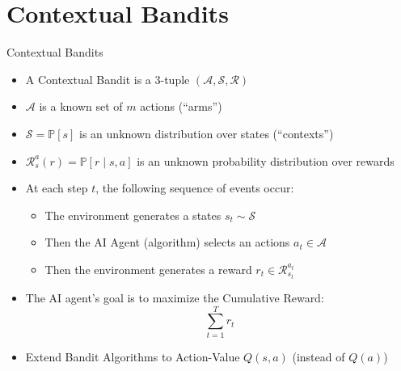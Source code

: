 \section{Contextual Bandits}
\begin{frame}[shrink=10]{Contextual Bandits}
\begin{itemize}
    \item A Contextual Bandit is a 3-tuple $(\mathcal{A}, \mathcal{S}, \mathcal{R})$
    \item $\mathcal{A}$ is a known set of $m$ actions (``arms'')
    \item $\mathcal{S} = \mathbb{P}[s]$ is an unknown distribution over states (``contexts'')
    \item $\mathcal{R}^{a}_{s}(r) = \mathbb{P}[r \mid s, a]$ is an unknown probability distribution over
          rewards
    \item At each step $t$, the following sequence of events occur:
    \begin{itemize}
        \item The environment generates a states $s_t \sim \mathcal{S}$
        \item Then the AI Agent (algorithm) selects an actions $a_t \in \mathcal{A}$
        \item Then the environment generates a reward $r_t \in \mathcal{R}^{a_t}_{s_t}$
    \end{itemize}
    \item The AI agent's goal is to maximize the Cumulative Reward:
    \[
        \sum_{t=1}^{T} r_t
    \]
    \item Extend Bandit Algorithms to Action-Value $Q(s, a)$ (instead of $Q(a)$)
\end{itemize}
\end{frame}
